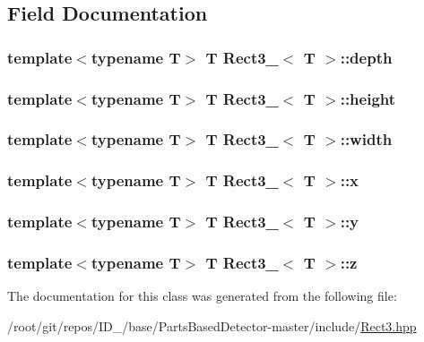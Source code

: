 \subsection{\-Field \-Documentation}
\hypertarget{classRect3___a73850e016f7e8152e47d430239c47cc2}{
\subsubsection[{depth}]{\setlength{\rightskip}{0pt plus 5cm}template$<$typename \-T$>$ \-T {\bf \-Rect3\-\_\-}$<$ \-T $>$\-::{\bf depth}}}\label{classRect3___a73850e016f7e8152e47d430239c47cc2}
\hypertarget{classRect3___a4f10fdcf15fe8cdb6b01a9b90d56ebe5}{
\subsubsection[{height}]{\setlength{\rightskip}{0pt plus 5cm}template$<$typename \-T$>$ \-T {\bf \-Rect3\-\_\-}$<$ \-T $>$\-::{\bf height}}}\label{classRect3___a4f10fdcf15fe8cdb6b01a9b90d56ebe5}
\hypertarget{classRect3___a780cbb24a81d6bbfff26c2ac6660beb8}{
\subsubsection[{width}]{\setlength{\rightskip}{0pt plus 5cm}template$<$typename \-T$>$ \-T {\bf \-Rect3\-\_\-}$<$ \-T $>$\-::{\bf width}}}\label{classRect3___a780cbb24a81d6bbfff26c2ac6660beb8}
\hypertarget{classRect3___a035f211c0c365a9dbd15436cb5448e31}{
\subsubsection[{x}]{\setlength{\rightskip}{0pt plus 5cm}template$<$typename \-T$>$ \-T {\bf \-Rect3\-\_\-}$<$ \-T $>$\-::{\bf x}}}\label{classRect3___a035f211c0c365a9dbd15436cb5448e31}
\hypertarget{classRect3___ab2c61e4e318bc064eb8bb707b699cbb6}{
\subsubsection[{y}]{\setlength{\rightskip}{0pt plus 5cm}template$<$typename \-T$>$ \-T {\bf \-Rect3\-\_\-}$<$ \-T $>$\-::{\bf y}}}\label{classRect3___ab2c61e4e318bc064eb8bb707b699cbb6}
\hypertarget{classRect3___a99bae7d4f2bf0af6a3ffbfb0fa752b9e}{
\subsubsection[{z}]{\setlength{\rightskip}{0pt plus 5cm}template$<$typename \-T$>$ \-T {\bf \-Rect3\-\_\-}$<$ \-T $>$\-::{\bf z}}}\label{classRect3___a99bae7d4f2bf0af6a3ffbfb0fa752b9e}


\-The documentation for this class was generated from the following file\-:\begin{DoxyCompactItemize}
\item 
/root/git/repos/\-I\-D\-\_/base/\-Parts\-Based\-Detector-\/master/include/\hyperlink{Rect3_8hpp}{\-Rect3.\-hpp}\end{DoxyCompactItemize}
